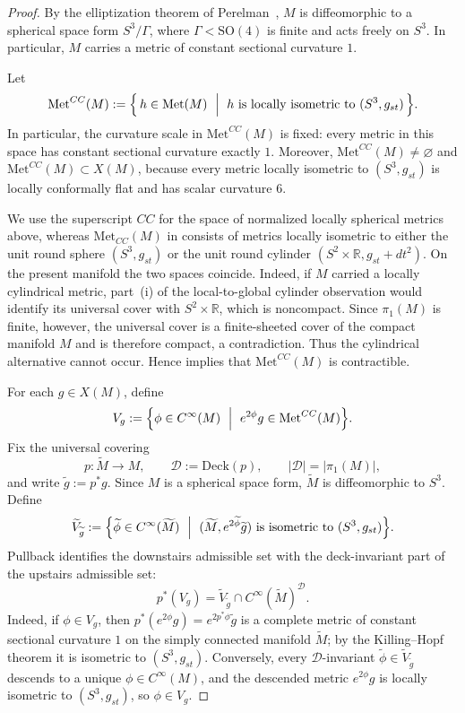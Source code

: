 \documentclass[12pt,oneside,a4paper]{article}
\theoremstyle{mytheorem}
\theoremstyle{remark}
\theoremstyle{definition}
\begin{document}
\begin{proof}
By the elliptization theorem of Perelman~\cite{2002math.....11159P,2003math......3109P}, $M$ is diffeomorphic to a spherical space form
$S^3/\Gamma$, where $\Gamma<\mathrm{SO}(4)$ is finite and acts freely on $S^3$.
In particular, $M$ carries a metric of constant sectional curvature $1$.

Let
\[
\mathrm{Met}^{CC}(M):=
\Bigl\{\, h\in \mathrm{Met}(M)\ \Bigm|\ h \text{ is locally isometric to } (S^3,g_{st})\,\Bigr\}.
\]
In particular, the curvature scale in $\mathrm{Met}^{CC}(M)$ is fixed: every metric in
this space has constant sectional curvature exactly $1$.
Moreover,
\(\mathrm{Met}^{CC}(M)\neq\varnothing\)
and
\(\mathrm{Met}^{CC}(M)\subset X(M)\),
because every metric locally isometric to $(S^3,g_{st})$ is locally
conformally flat and has scalar curvature $6$.

We use the superscript $CC$ for the space of normalized locally spherical
metrics above,
whereas $\mathrm{Met}_{CC}(M)$ in
\cite[Theorem~1.2]{2019arXiv190908710B} consists of metrics locally isometric
to either the unit round sphere $(S^3,g_{st})$ or the unit round cylinder
$(S^2\times\mathbb R,g_{st}+dt^2)$. On the present manifold the two spaces
coincide. Indeed, if $M$ carried a locally cylindrical metric, part~(i) of the
local-to-global cylinder observation would identify its universal cover with
$S^2\times\mathbb R$, which is noncompact. Since $\pi_1(M)$ is finite,
however, the universal cover is a finite-sheeted cover of the compact
manifold $M$ and is therefore compact, a contradiction. Thus the cylindrical
alternative cannot occur. Hence
\cite[Theorem~1.2]{2019arXiv190908710B} implies that
$\mathrm{Met}^{CC}(M)$ is contractible.

For each $g\in X(M)$, define
\[
V_g:=\Bigl\{\phi\in C^\infty(M)\ \Bigm|\ e^{2\phi}g\in \mathrm{Met}^{CC}(M)\Bigr\}.
\]
Fix the universal covering
\[
p\colon\widetilde M\longrightarrow M,
\qquad
\mathcal D:=\mathrm{Deck}(p),
\qquad
|\mathcal D|=|\pi_1(M)|,
\]
and write $\widetilde g:=p^*g$. Since $M$ is a spherical space form,
$\widetilde M$ is diffeomorphic to $S^3$. Define
\[
\widetilde V_{\widetilde g}
:=
\Bigl\{\widetilde\phi\in C^\infty(\widetilde M)
\ \Bigm|\
(\widetilde M,e^{2\widetilde\phi}\widetilde g)
\text{ is isometric to }(S^3,g_{st})
\Bigr\}.
\]
Pullback identifies the downstairs admissible set with the deck-invariant
part of the upstairs admissible set:
\[
p^*(V_g)
=
\widetilde V_{\widetilde g}
\cap C^\infty(\widetilde M)^{\mathcal D}.
\]
Indeed, if $\phi\in V_g$, then
$p^*(e^{2\phi}g)=e^{2p^*\phi}\widetilde g$ is a complete metric of constant
sectional curvature $1$ on the simply connected manifold $\widetilde M$; by
the Killing--Hopf theorem it is isometric to $(S^3,g_{st})$. Conversely, every
$\mathcal D$-invariant
$\widetilde\phi\in\widetilde V_{\widetilde g}$ descends to a unique
$\phi\in C^\infty(M)$, and the descended metric $e^{2\phi}g$ is locally
isometric to $(S^3,g_{st})$, so $\phi\in V_g$.


\end{proof}
\end{document}
